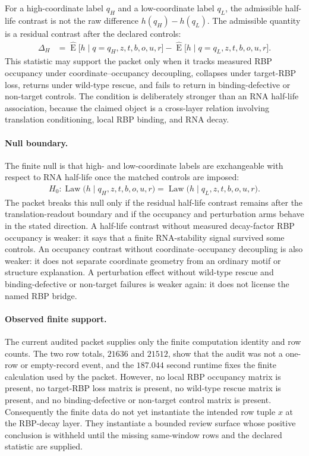 For a high-coordinate label $q_H$ and a low-coordinate label $q_L$, the admissible half-life contrast is not the raw difference $h(q_H)-h(q_L)$.  The admissible quantity is a residual contrast after the declared controls:
$$
\begin{aligned}
  \Delta_H
  &= \widehat{\operatorname{E}}\bigl[h \mid q=q_H, z, t, b, o, u, r\bigr]
   - \widehat{\operatorname{E}}\bigl[h \mid q=q_L, z, t, b, o, u, r\bigr].
\end{aligned}
$$
This statistic may support the packet only when it tracks measured RBP occupancy under coordinate--occupancy decoupling, collapses under target-RBP loss, returns under wild-type rescue, and fails to return in binding-defective or non-target controls.  The condition is deliberately stronger than an RNA half-life association, because the claimed object is a cross-layer relation involving translation conditioning, local RBP binding, and RNA decay.

\paragraph{Null boundary.}
The finite null is that high- and low-coordinate labels are exchangeable with respect to RNA half-life once the matched controls are imposed:
$$
\begin{aligned}
  H_0:
  \operatorname{Law}\bigl(h \mid q_H,z,t,b,o,u,r\bigr)
  =
  \operatorname{Law}\bigl(h \mid q_L,z,t,b,o,u,r\bigr).
\end{aligned}
$$
The packet breaks this null only if the residual half-life contrast remains after the translation-readout boundary and if the occupancy and perturbation arms behave in the stated direction.  A half-life contrast without measured decay-factor RBP occupancy is weaker: it says that a finite RNA-stability signal survived some controls.  An occupancy contrast without coordinate--occupancy decoupling is also weaker: it does not separate coordinate geometry from an ordinary motif or structure explanation.  A perturbation effect without wild-type rescue and binding-defective or non-target failures is weaker again: it does not license the named RBP bridge.

\paragraph{Observed finite support.}
The current audited packet supplies only the finite computation identity and row counts.  The two row totals, $21636$ and $21512$, show that the audit was not a one-row or empty-record event, and the $187.044$ second runtime fixes the finite calculation used by the packet.  However, no local RBP occupancy matrix is present, no target-RBP loss matrix is present, no wild-type rescue matrix is present, and no binding-defective or non-target control matrix is present.  Consequently the finite data do not yet instantiate the intended row tuple $x$ at the RBP-decay layer.  They instantiate a bounded review surface whose positive conclusion is withheld until the missing same-window rows and the declared statistic are supplied.


